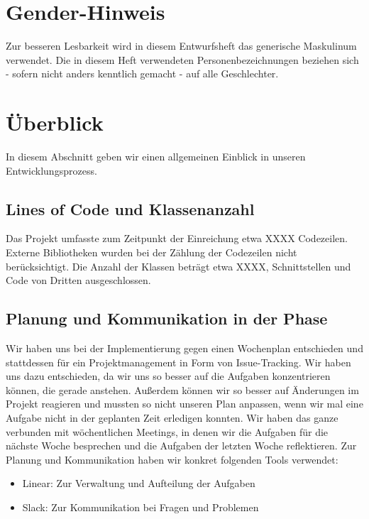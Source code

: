 \documentclass{implementierungsheft}
\begin{document}

\maketitle
\tableofcontents
\newpage

\section*{Gender-Hinweis}
Zur besseren Lesbarkeit wird in diesem Entwurfsheft das generische Maskulinum verwendet.
Die in diesem Heft verwendeten Personenbezeichnungen beziehen sich - sofern nicht anders kenntlich gemacht - auf alle Geschlechter.
\newpage

\section{Überblick}
In diesem Abschnitt geben wir einen allgemeinen Einblick in unseren Entwicklungsprozess.

\subsection{Lines of Code und Klassenanzahl}
Das Projekt umfasste zum Zeitpunkt der Einreichung etwa XXXX Codezeilen. Externe Bibliotheken wurden bei der Zählung der Codezeilen nicht berücksichtigt. Die Anzahl der Klassen beträgt etwa XXXX, Schnittstellen
und Code von Dritten ausgeschlossen.
\subsection{Planung und Kommunikation in der Phase}
Wir haben uns bei der Implementierung gegen einen Wochenplan entschieden und stattdessen für ein Projektmanagement in Form von Issue-Tracking.
Wir haben uns dazu entschieden, da wir uns so besser auf die Aufgaben konzentrieren können, die gerade anstehen.
Außerdem können wir so besser auf Änderungen im Projekt reagieren und mussten so nicht unseren Plan anpassen, wenn wir mal eine Aufgabe nicht in der geplanten Zeit erledigen konnten.
Wir haben das ganze verbunden mit wöchentlichen Meetings, in denen wir die Aufgaben für die nächste Woche besprechen und die Aufgaben der letzten Woche reflektieren.
Zur Planung und Kommunikation haben wir konkret folgenden Tools verwendet:
\begin{itemize}
    \item Linear: Zur Verwaltung und Aufteilung der Aufgaben
    \item Slack: Zur Kommunikation bei Fragen und Problemen
\end{itemize}
\end{document}
